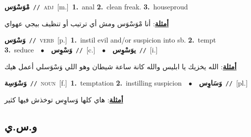 \documentclass[10pt,a4paper,twoside]{article} %
\begin{document}
\begin{multicols}{2}
{\setlength\topsep{0pt}\textbf{\foreignlanguage{arabic}{مْوَسْوَس}}\ {\color{gray}\texttt{//}\color{black}}\ \textsc{adj}\ [m.]\ \textbf{1.}~anal  \textbf{2.}~clean freak.  \textbf{3.}~houseproud\  \begin{flushright}\color{gray}\foreignlanguage{arabic}{\textbf{\underline{\foreignlanguage{arabic}{أمثلة}}}: أنا مْوَسْوَس ومش أي ترتيب أو تنظيف بيجي عهواي}\end{flushright}\color{black}} \vspace{2mm}

{\setlength\topsep{0pt}\textbf{\foreignlanguage{arabic}{وَسْوَس}}\ {\color{gray}\texttt{//}\color{black}}\ \textsc{verb}\ [p.]\ \textbf{1.}~instil evil and/or suspicion into sb.  \textbf{2.}~tempt  \textbf{3.}~seduce\ \ $\bullet$\ \ \setlength\topsep{0pt}\textbf{\foreignlanguage{arabic}{وَسْوِس}}\ {\color{gray}\texttt{//}\color{black}}\ [c.]\ \ $\bullet$\ \ \setlength\topsep{0pt}\textbf{\foreignlanguage{arabic}{يوَسْوِس}}\ {\color{gray}\texttt{//}\color{black}}\ [i.]\  \begin{flushright}\color{gray}\foreignlanguage{arabic}{\textbf{\underline{\foreignlanguage{arabic}{أمثلة}}}: الله يخزيك يا ابليس والله كانة ساعة شيطان وهو اللي وَسْوَسلي أعمل هيك}\end{flushright}\color{black}} \vspace{2mm}

{\setlength\topsep{0pt}\textbf{\foreignlanguage{arabic}{وَسْوَسِة}}\ {\color{gray}\texttt{//}\color{black}}\ \textsc{noun}\ [f.]\ \textbf{1.}~temptation  \textbf{2.}~instilling suspicion\ \ $\bullet$\ \ \setlength\topsep{0pt}\textbf{\foreignlanguage{arabic}{وَسَاوِس}}\ {\color{gray}\texttt{//}\color{black}}\ [pl.]\  \begin{flushright}\color{gray}\foreignlanguage{arabic}{\textbf{\underline{\foreignlanguage{arabic}{أمثلة}}}: هاي كلها وَساوِس توخذش فيها كثير}\end{flushright}\color{black}} \vspace{2mm}

\vspace{-3mm}
\subsection*{\color{blue}\foreignlanguage{arabic}{و.س.ي}\color{blue}{}} 


\end{multicols}
\end{document}
